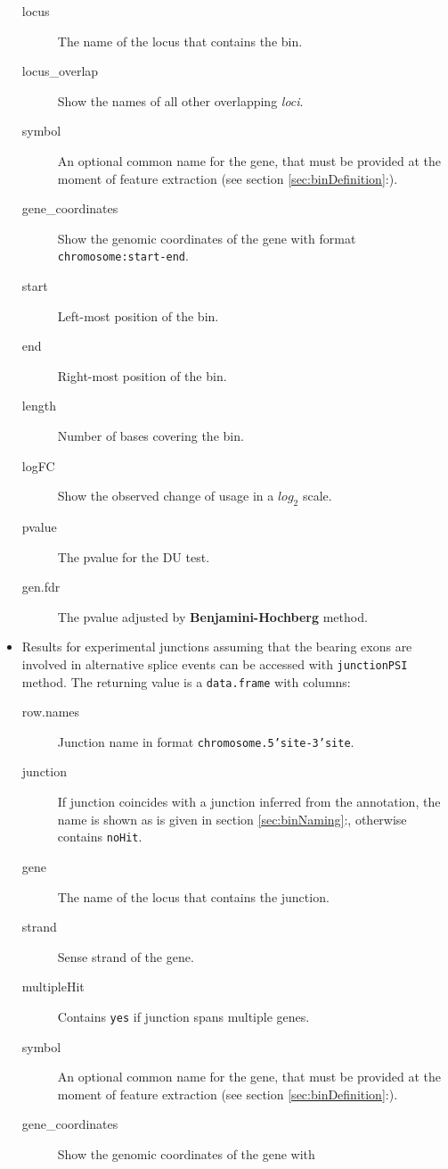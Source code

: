\documentclass{article}
\begin{document}
\begin{itemize}
\begin{description}
      \item[locus] The name of the locus that contains the bin.
      \item[locus\_overlap] Show the names of all other overlapping \textit{loci}.
      \item[symbol] An optional common name for the gene, that must be provided at
      the moment of feature extraction (see section \ref{sec:binDefinition}:).
      \item[gene\_coordinates] Show the genomic coordinates of the gene with
      format \texttt{chromosome:start-end}.
      \item[start] Left-most position of the bin.
      \item[end] Right-most position of the bin.
      \item[length] Number of bases covering the bin.
      \item[logFC] Show the observed change of usage in a $log_{2}$
      scale.
      \item[pvalue] The pvalue for the DU test.
      \item[gen.fdr] The pvalue adjusted by \textbf{Benjamini-Hochberg} method.
      \\
    \end{description}
  \item Results for experimental junctions assuming that the bearing
  exons are involved in alternative splice events can be accessed with
  \texttt{junctionPSI} method. The returning value is a \texttt{data.frame} with
  columns:
    \begin{description}
      \item[row.names] Junction name in format \texttt{chromosome.5'site-3'site}.
      \item[junction] If junction coincides with a junction inferred
      from the annotation, the name is shown as is given in section
      \ref{sec:binNaming}:, otherwise contains \texttt{noHit}.
      \item[gene] The name of the locus that contains the junction.
      \item[strand] Sense strand of the gene.
      \item[multipleHit] Contains \texttt{yes} if junction spans multiple genes.
      \item[symbol] An optional common name for the gene, that must be provided at
      the moment of feature extraction (see section \ref{sec:binDefinition}:).
      \item[gene\_coordinates] Show the genomic coordinates of the gene with

\end{description}
\end{itemize}
\end{document}
